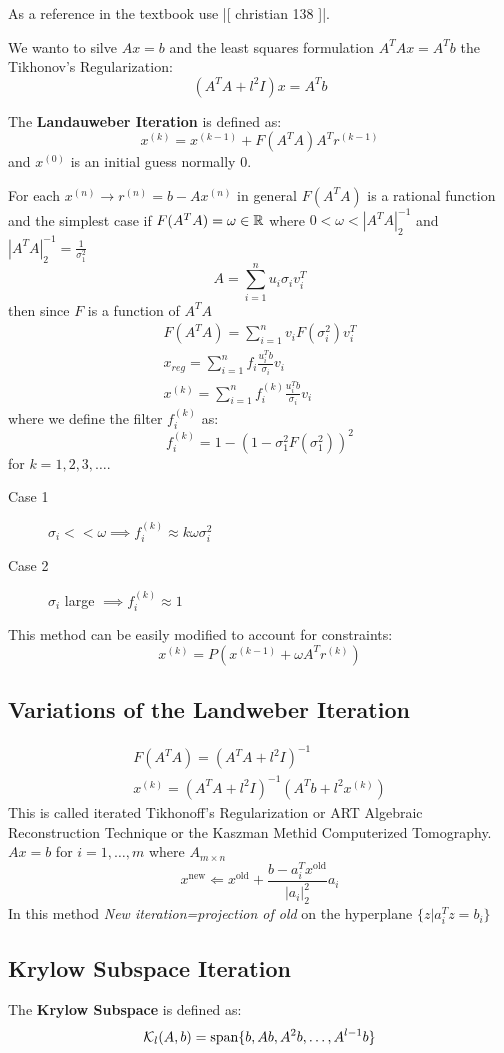 As a reference in the textbook use |[ christian 138 ]|.

We wanto to silve $Ax=b$ and the least squares formulation $  A^TAx = A^T b$ the Tikhonov's Regularization:
$$(A^TA + l^2I)x = A^Tb$$
\begin{ddef}
The \textbf{Landauweber Iteration} is defined as:
$$x^{(k)} = x^{(k-1)} + F(A^TA) A^T r^{(k-1)}$$
and $x^{(0)}$ is an initial guess normally 0.
\end{ddef}
For each $x^{(n)} \to r^{(n)} = b-Ax^{(n)}$ in general $F(A^TA)$ is a rational function and the simplest case if $F(A^TA) = \omega \in \mathbb{R}$ where $0<\omega < |A^TA|_2^{-1}$ and $|A^TA|_2^{-1} = \frac{1}{\sigma_1^2}$
$$A= \sum_{i=1}^n u_i\sigma_i v_i^T$$
then since $F$ is a function of $A^TA$
\begin{gather*}
F(A^TA) = \sum_{i=1}^n v_iF(\sigma_i^2) v_i^T\\
x_{reg} = \sum_{i=1}^n f_i \frac{u_i^Tb}{\sigma_i} v_i\\
x^{(k)} = \sum_{i=1} ^n f^{(k)}_i \frac{u_i^Tb}{\sigma_i} v_i
\end{gather*}
where we define  the filter $f_i^{(k)}$ as:
$$f_i^{(k)} = 1-(1-\sigma_1^2F(\sigma_1^2))^2$$
for $k=1,2,3,\ldots$. 
\begin{description}
\item[Case 1] $\sigma_i << \omega \implies f_i^{(k)} \approx k\omega \sigma_i^2$
\item[Case 2] $\sigma_i$ large $\implies f_i^{(k)} \approx 1$ 
\end{description}
This method can be easily modified to account for constraints:
$$x^{(k) }= P(x^{(k-1)}+\omega A^Tr^{(k)})$$

\subsection{Variations of the Landweber Iteration}
\begin{gather*}
F(A^TA) = (A^TA + l^2 I)^{-1} \\
x^{(k)}=(A^TA + l^2 I)^{-1} (A^Tb + l^2x^{(k)})
\end{gather*}
This is called iterated Tikhonoff's Regularization or ART Algebraic Reconstruction Technique or the Kaszman Methid Computerized Tomography. $Ax=b$ for $i=1,\ldots,m$ where $A_{m\times n}$ 
$$x^{\text{new}} \Leftarrow x^{\text{old}} + \frac{b-a_i^Tx^{\text{old}}}{|a_i|_2^2} a_i$$
In this method \emph{New iteration=projection of old} on the hyperplane $\{z| a_i^Tz = b_i \}$

\subsection{Krylow Subspace Iteration}
\begin{ddef}
The \textbf{Krylow Subspace }is defined as:
$$\mathbf{\mathcal{K}}_l(A,b) = \text{span} \{b,Ab,A^2b,\ldots,A^{l-1}b \}$$
\end{ddef}
